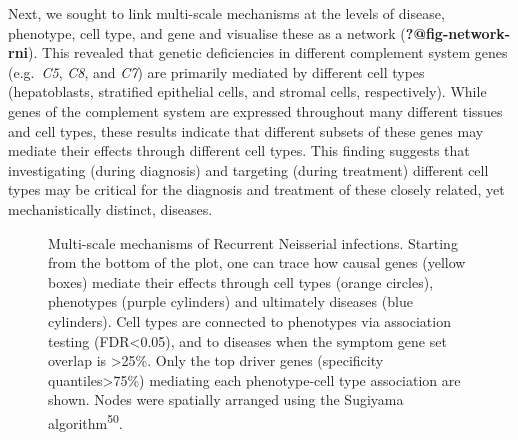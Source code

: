 \documentclass[
]{report}
\begin{document}
Next, we sought to link multi-scale mechanisms at the levels of disease,
phenotype, cell type, and gene and visualise these as a network
(\textbf{?@fig-network-rni}). This revealed that genetic deficiencies in
different complement system genes (e.g.~\emph{C5}, \emph{C8}, and
\emph{C7}) are primarily mediated by different cell types (hepatoblasts,
stratified epithelial cells, and stromal cells, respectively). While
genes of the complement system are expressed throughout many different
tissues and cell types, these results indicate that different subsets of
these genes may mediate their effects through different cell types. This
finding suggests that investigating (during diagnosis) and targeting
(during treatment) different cell types may be critical for the
diagnosis and treatment of these closely related, yet mechanistically
distinct, diseases.

\begin{figure}[H]


\caption{\label{fig-network-rniD08295A6-16DC-499D-85A8-8BA656E013A2}Multi-scale
mechanisms of Recurrent Neisserial infections. Starting from the bottom
of the plot, one can trace how causal genes (yellow boxes) mediate their
effects through cell types (orange circles), phenotypes (purple
cylinders) and ultimately diseases (blue cylinders). Cell types are
connected to phenotypes via association testing (FDR\textless0.05), and
to diseases when the symptom gene set overlap is \textgreater25\%. Only
the top driver genes (specificity quantiles\textgreater75\%) mediating
each phenotype-cell type association are shown. Nodes were spatially
arranged using the Sugiyama algorithm\textsuperscript{50}.}

\end{figure}%
\end{document}
